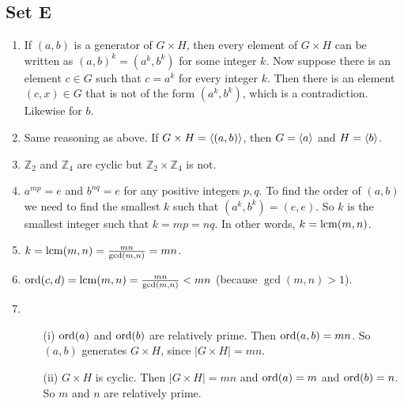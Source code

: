 \subsection{Set E}
\begin{enumerate}
    \item If $(a, b)$ is a generator of $G \times H$, then every element of $G \times H$ can be written as $(a, b)^k = (a^k, b^k)$ for some integer $k$. Now suppose there is an element $c \in G$ such that $c = a^k$ for every integer $k$. Then there is an element $(c, x) \in G$ that is not of the form $(a^k, b^k)$, which is a contradiction. Likewise for $b$.
    
    \item Same reasoning as above. If $G \times H = \langle(a, b)\rangle$, then $G = \langle a\rangle$ and $H = \langle b\rangle$.
    
    \item $\mathbb{Z}_2$ and $\mathbb{Z}_4$ are cyclic but $\mathbb{Z}_2 \times \mathbb{Z}_4$ is not.
    
    \item $a^{mp} = e$ and $b^{nq} = e$ for any positive integers $p, q$. To find the order of $(a, b)$ we need to find the smallest $k$ such that $(a^k, b^k) = (e, e)$. So $k$ is the smallest integer such that $k = mp = nq$. In other words, $k = \operatorname{lcm}(m, n)$.
    
    \item $k = \operatorname{lcm}(m, n) = \frac{mn}{\gcd(m, n)} = mn$.
    
    \item $\operatorname{ord}(c, d) = \operatorname{lcm}(m, n) = \frac{mn}{\gcd(m, n)} < mn$ (because $\gcd(m, n) > 1$).
    
    \item 
    \begin{enumerate}
        \item [(i)] $\operatorname{ord}(a)$ and $\operatorname{ord}(b)$ are relatively prime. Then $\operatorname{ord}(a, b) = mn$. So $(a, b)$ generates $G \times H$, since $|G \times H| = mn$.
        \item [(ii)] $G \times H$ is cyclic. Then $|G \times H| = mn$ and $\operatorname{ord}(a) = m$ and $\operatorname{ord}(b) = n$. So $m$ and $n$ are relatively prime.
    \end{enumerate}
\end{enumerate}
